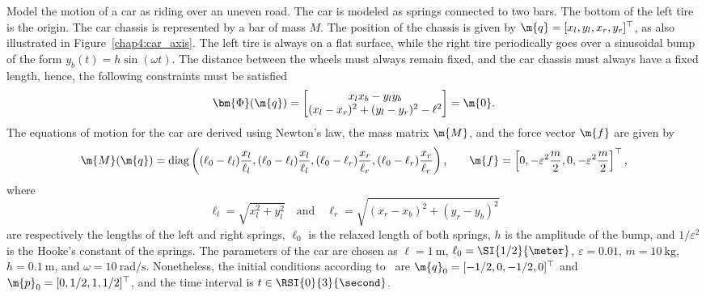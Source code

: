 Model the motion of a car as riding over an uneven road. The car is modeled as springs connected to two bars. The bottom of the left tire is the origin. The car chassis is represented by a bar of mass $M$. The position of the chassis is given by $\m{q} = [x_l, y_l, x_r, y_r]^\top$, as also illustrated in Figure~\ref{chap4:car_axis}. The left tire is always on a flat surface, while the right tire periodically goes over a sinusoidal bump of the form $y_b(t) = h\sin(\omega t)$. The distance between the wheels must always remain fixed, and the car chassis must always have a fixed length, hence, the following constraints must be satisfied
%
\begin{equation*}
  \bm{\Phi}(\m{q}) = \begin{bmatrix}
    x_l x_b - y_l y_b \\
    (x_l - x_r)^2 + (y_l - y_r)^2 - \ell^2
  \end{bmatrix} = \m{0} \text{.}
\end{equation*}
%
The equations of motion for the car are derived using Newton's law, the mass matrix $\m{M}$, and the force vector $\m{f}$ are given by
%
\begin{equation*}
  \m{M}(\m{q}) = \mathrm{diag}\left(
    (\ell_0-\ell_l)\dfrac{x_l}{\ell_l},
    (\ell_0-\ell_l)\dfrac{x_l}{\ell_l},
    (\ell_0-\ell_r)\dfrac{x_r}{\ell_r},
    (\ell_0-\ell_r)\dfrac{x_r}{\ell_r}
  \right)
  \text{,}
  \qquad
  \m{f} = \left[
    0, -\varepsilon^2\dfrac{m}{2},
    0, -\varepsilon^2\dfrac{m}{2}
  \right]^{\top}
  \text{,}
\end{equation*}
%
where
%
\begin{equation*}
  \ell_l = \sqrt{x_l^2 + y_l^2}
  \quad \text{and} \quad
  \ell_r = \sqrt{(x_r - x_b)^2 + (y_r - y_b)^2}
\end{equation*}
%
are respectively the lengths of the left and right springs, $\ell_0$ is the relaxed length of both springs, $h$ is the amplitude of the bump, and $1/\varepsilon^2$ is the Hooke's constant of the springs. The parameters of the car are chosen as $\ell = \SI{1}{\meter}$, $\ell_0 = \SI{1/2}{\meter}$, $\varepsilon = 0.01$, $m = \SI{10}{\kilo\gram}$, $h = \SI{0.1}{\meter}$, and $\omega = \SI{10}{\radian\per\second}$. Nonetheless, the initial conditions according to~\cite{lioen1998test, mazzia2008test} are $\m{q}_0 = [-1/2, 0, -1/2, 0]^\top$ and $\m{p}_0 = [0, 1/2, 1, 1/2]^\top$, and the time interval is $t \in \RSI{0}{3}{\second}$.

